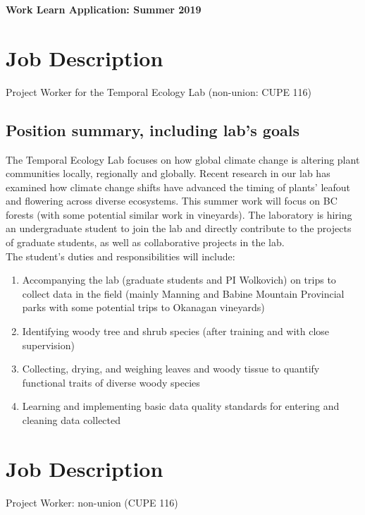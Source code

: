 \documentclass[11pt, oneside]{article}   	%
\begin{document}
\noindent \textbf{\Large{Work Learn Application: Summer 2019}}

\section {Job Description} 
Project Worker for the Temporal Ecology Lab (non-union: CUPE 116)

\subsection {Position summary, including lab's goals}
The Temporal Ecology Lab focuses on how global climate change is altering plant communities locally, regionally and globally. Recent research in our lab has examined how climate change shifts have advanced the timing of plants' leafout and flowering across diverse ecosystems. This summer work will focus on BC forests (with some potential similar work in vineyards). The laboratory is hiring an undergraduate student to join the lab and directly contribute to the projects of graduate students, as well as collaborative projects in the lab. \\

The student's duties and responsibilities will include:

\begin{enumerate}
\item Accompanying the lab (graduate students and PI Wolkovich) on trips to collect data in the field (mainly Manning and Babine Mountain Provincial parks with some potential trips to Okanagan vineyards)
\item Identifying woody tree and shrub species (after training and with close supervision)
\item Collecting, drying, and weighing leaves and woody tissue to quantify functional traits of diverse woody species
\item Learning and implementing basic data quality standards for entering and cleaning data collected
\end{enumerate}

\section {Job Description}
Project Worker: non-union (CUPE 116)

\end{document}
